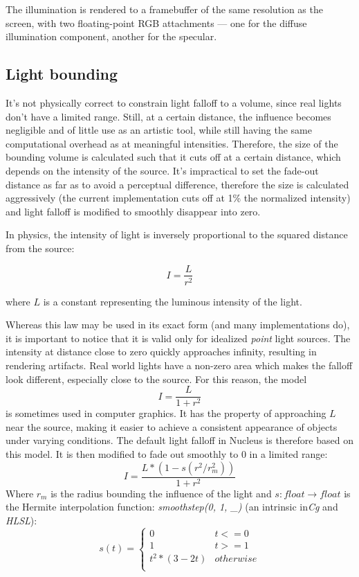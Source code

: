 The illumination is rendered to a framebuffer of the same resolution as the screen, with two floating-point RGB attachments --- one for the diffuse illumination component, another for the specular.

\subsection{Light bounding}

It's not physically correct to constrain light falloff to a volume, since real lights don't have a limited range. Still, at a certain distance, the influence becomes negligible and of little use as an artistic tool, while still having the same computational overhead as at meaningful intensities. Therefore, the size of the bounding volume is calculated such that it cuts off at a certain distance, which depends on the intensity of the source. It's impractical to set the fade-out distance as far as to avoid a perceptual difference, therefore the size is calculated aggressively (the current implementation cuts off at 1\% the normalized intensity) and light falloff is modified to smoothly disappear into zero.

In physics, the intensity of light is inversely proportional to the squared distance from the source:
	
\[
	I = \frac{L}{r^2}
\]

where $L$ is a constant representing the luminous intensity of the light.

Whereas this law may be used in its exact form (and many implementations do), it is important to notice that it is valid only for idealized \emph{point} light sources. The intensity at distance close to zero quickly approaches infinity, resulting in rendering artifacts. Real world lights have a non-zero area which makes the falloff look different, especially close to the source. For this reason, the model
\[
	I = \frac{L}{1 + r^2}
\]
is sometimes used in computer graphics. It has the property of approaching $L$ near the source, making it easier to achieve a consistent appearance of objects under varying conditions. The default light falloff in Nucleus is therefore based on this model. It is then modified to fade out smoothly to $0$ in a limited range:
\[
	I = \frac{L * (1 - s(r^2 / r_m^2))}{1 + r^2}
\]
Where $r_m$ is the radius bounding the influence of the light and $s : float \rightarrow float$ is the Hermite interpolation function: \emph{smoothstep(0, 1, \_)} (an intrinsic in\emph{Cg} and \emph{HLSL}):
\[
	s(t) =
	\begin{cases}
	0 & t <= 0 \\
	1 & t >= 1 \\
	t^2 * (3 - 2t) & otherwise \\
	\end{cases}
\]

